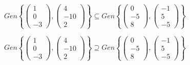 \documentclass{article}
\begin{document}
\begin{enumerate}
        \ResetCases{}
        \begin{mathcase}{%
                \(%
                    Gen\left\{%
                        \begin{pmatrix}1 \\ 0 \\ -3\end{pmatrix},%
                        \begin{pmatrix}4 \\ -10 \\ 2\end{pmatrix}%
                    \right\}%
                    \subseteq
                    Gen\left\{%
                        \begin{pmatrix}0 \\ -5 \\ 8\end{pmatrix},%
                        \begin{pmatrix}-1 \\ 5 \\ -5\end{pmatrix}
                    \right\}%
                \)%
            }
        \end{mathcase}
        \begin{mathcase}{%
                \(%
                    Gen\left\{%
                        \begin{pmatrix}1 \\ 0 \\ -3\end{pmatrix},%
                        \begin{pmatrix}4 \\ -10 \\ 2\end{pmatrix}%
                    \right\}%
                    \supseteq
                    Gen\left\{%
                        \begin{pmatrix}0 \\ -5 \\ 8\end{pmatrix},%
                        \begin{pmatrix}-1 \\ 5 \\ -5\end{pmatrix}
                    \right\}%
                \)%
            }
        \end{mathcase}
\end{enumerate}
\end{document}
